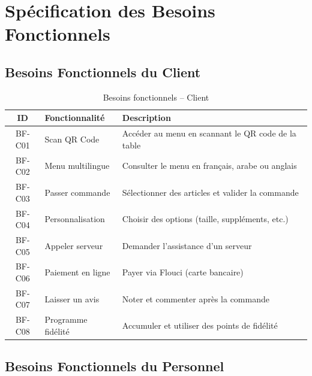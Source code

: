 \documentclass[12pt,a4paper]{report}
\begin{document}
\section{Spécification des Besoins Fonctionnels}

\subsection{Besoins Fonctionnels du Client}

\begin{table}[H]
    \centering
    \begin{tabularx}{\textwidth}{c l X}
        \toprule
        \rowcolor{primary!10}
        \textbf{ID} & \textbf{Fonctionnalité} & \textbf{Description} \\
        \midrule
        BF-C01 & Scan QR Code & Accéder au menu en scannant le QR code de la table \\
        BF-C02 & Menu multilingue & Consulter le menu en français, arabe ou anglais \\
        BF-C03 & Passer commande & Sélectionner des articles et valider la commande \\
        BF-C04 & Personnalisation & Choisir des options (taille, suppléments, etc.) \\
        BF-C05 & Appeler serveur & Demander l'assistance d'un serveur \\
        BF-C06 & Paiement en ligne & Payer via Flouci (carte bancaire) \\
        BF-C07 & Laisser un avis & Noter et commenter après la commande \\
        BF-C08 & Programme fidélité & Accumuler et utiliser des points de fidélité \\
        \bottomrule
    \end{tabularx}
    \caption{Besoins fonctionnels -- Client}
    \label{tab:bf-client}
\end{table}

\subsection{Besoins Fonctionnels du Personnel}
\end{document}

